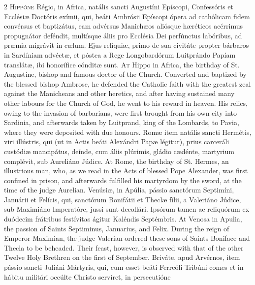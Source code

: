 \begin{paracol}{2}
\lettrine[lines=2]{H}{ippóne} Régio, in 
 Africa, natális sancti Augustíni Epíscopi, Confessóris et Ecclésiæ Doctóris 
 exímii, qui, beáti Ambrósii Epíscopi ópera ad cathólicam fidem convérsus et 
 baptizátus, eam advérsus Manichæos aliósque hæréticos acérrimus propugnátor 
 deféndit, multísque áliis pro Ecclésia Dei perfúnctus labóribus, ad præmia 
 migrávit in cælum. Ejus relíquiæ, primo de sua civitáte propter 
 bárbaros in Sardíniam advéctæ, et póstea a Rege Longobardórum Luitprándo 
 Papíam translátæ, ibi honorífice cónditæ sunt.
\switchcolumn
{}
\lettrine[lines=2]{A}{t} Hippo in Africa, the birthday of 
 St. Augustine, bishop and famous doctor of the Church. Converted and 
 baptized by the blessed bishop Ambrose, he defended the Catholic faith with 
 the greatest zeal against the Manicheans and other heretics, and after 
 having sustained many other labours for the Church of God, he went to his 
 reward in heaven. His relics, owing to the invasion of barbarians, 
 were first brought from his own city into Sardinia, and afterwards taken by Luitprand, king of the Lombards, to Pavia, where they were deposited with 
 due honours.
\switchcolumn*
{}
Romæ item natális 
 sancti Hermétis, viri illústris, qui (ut in Actis beáti Alexándri Papæ 
 légitur), prius carceráli custódiæ mancipátus, deínde, cum áliis plúrimis, 
 gládio cædénte, martyrium complévit, sub Aureliáno Júdice.
\switchcolumn
{}
At Rome, the birthday of St. Hermes, 
 an illustrious man, who, as we read in the Acts of blessed Pope Alexander, 
 was first confined in prison, and afterwards fulfilled his martyrdom by the 
 sword, at the time of the judge Aurelian.
\switchcolumn*
{}
Venúsiæ, in Apúlia, pássio sanctórum Septimíni, Januárii et Felícis, qui, sanctórum Bonifátii et 
 Theclæ fílii, a Valeriáno Júdice, sub Maximiáno Imperatóre, jussi sunt 
 decollári. Ipsórum tamen ac reliquórum ex duódecim frátribus 
 festívitas ágitur Kaléndis Septémbris.
\switchcolumn
{}
At Venosa in Apulia, the passion of 
 Saints Septiminus, Januarius, and Felix. During the reign of Emperor 
 Maximian, the judge Valerian ordered these sons of Saints Boniface and 
 Thecla to be beheaded. Their feast, however, is observed with that of 
 the other Twelve Holy Brethren on the first of September.
\switchcolumn*
{}
Briváte, apud Arvérnos, 
 item pássio sancti Juliáni Mártyris, qui, cum esset beáti Ferreóli Tribúni 
 comes et in hábitu militári occúlte Christo servíret, in persecutióne 

\end{paracol}
